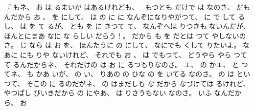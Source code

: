 %
『
もネ、
%
お
は
るまいが
はあるけれども、{---}もつとも
だけで
は
なのさ、
%
だもんだから
お
、
%
を
にして、
%
は
の
に
に
なんぞになりやがつて、
%
に
で
して
るし、
%
は
を
て
るが、
%
とも
を
に
きつて
て、
%
なんぞへは
りつきも
ないんだが、
%
ほんとにまあ
なに
な
らしい
だらう！。
%
だから
も
を
だとは
つて
やしないのさ。
%
じ
なら
は
お
を、
%
ほんたうに
の
にして、
%
なにでも
くして
りたいよ。
%
なあに
にも
りや
ないけれど、
%
それでも
お
、
%
は
でもつて、
%
どうやら
やら
つて
て
るんだからネ、
%
それだけの
は
お
に
るつもりなのさ。
%
エ、
%
の
かエ、
%
と
つてネ、
%
も
かあ
いが、
%
の
い、
%
りあの
の
ひな
の
を
いてる
なのさ。
%
の
は
といつて、
%
そこの
に
るのだがネ、
%
の
はまだしも
な
だから
なづけては
るけれど、
%
やつぱし
びいきだから
の
にやあ、
%
は
りさうもない
なのさ。
%
いふ
なんだから、
%
お
